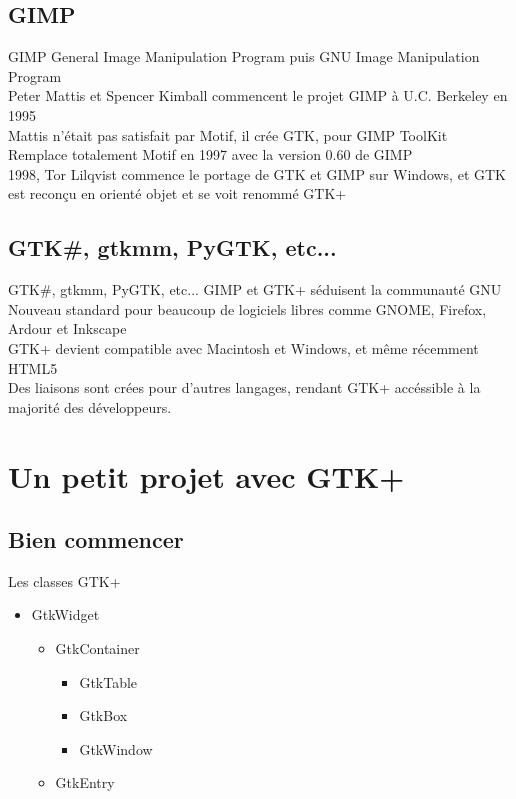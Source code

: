 \documentclass{beamer}
\begin{document}
  \subsection{GIMP}
  \begin{frame}{GIMP}
    General Image Manipulation Program puis GNU Image Manipulation Program\\
    Peter Mattis et Spencer Kimball commencent le projet GIMP à U.C. Berkeley en 1995\\
    Mattis n'était pas satisfait par Motif, il crée GTK, pour GIMP ToolKit\\
    Remplace totalement Motif en 1997 avec la version 0.60 de GIMP\\
    1998, Tor Lilqvist commence le portage de GTK et GIMP sur Windows, et GTK est reconçu en orienté objet et se voit renommé GTK+
  \end{frame}

  \subsection{GTK\#, gtkmm, PyGTK, etc...}
  \begin{frame}{GTK\#, gtkmm, PyGTK, etc...}
    GIMP et GTK+ séduisent la communauté GNU\\
    Nouveau standard pour beaucoup de logiciels libres comme GNOME, Firefox, Ardour et Inkscape\\
    GTK+ devient compatible avec Macintosh et Windows, et même récemment HTML5\\
    Des liaisons sont crées pour d'autres langages, rendant GTK+ accéssible à la majorité des développeurs.
  \end{frame}

  \section{Un petit projet avec GTK+}
  \subsection{Bien commencer}
  \begin{frame}{Les classes GTK+}
  \begin{itemize}
  \item GtkWidget\\
  \begin{itemize}
  \item GtkContainer\\
  \begin{itemize}
  \item	GtkTable\\
  \item	GtkBox\\
  \item GtkWindow\\
  \end{itemize}
  \item GtkEntry\\
  \end{itemize}
  \end{itemize}
  \end{frame}
\end{document}
